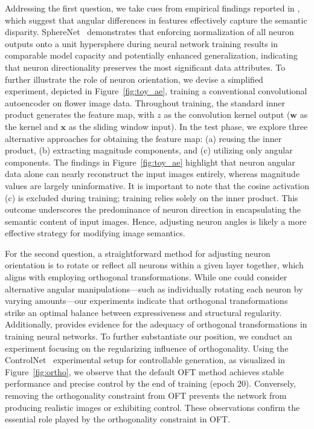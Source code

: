 Addressing the first question, we take cues from empirical findings reported in \cite{liu2018decoupled,chen2020angular}, which suggest that angular differences in features effectively capture the semantic disparity. SphereNet~\cite{liu2017deep} demonstrates that enforcing normalization of all neuron outputs onto a unit hypersphere during neural network training results in comparable model capacity and potentially enhanced generalization, indicating that neuron directionality preserves the most significant data attributes. To further illustrate the role of neuron orientation, we devise a simplified experiment, depicted in Figure~\ref{fig:toy_ae}, training a conventional convolutional autoencoder on flower image data. Throughout training, the standard inner product generates the feature map, with $z$ as the convolution kernel output ($\bm{w}$ as the kernel and $\bm{x}$ as the sliding window input). In the test phase, we explore three alternative approaches for obtaining the feature map: (a) reusing the inner product, (b) extracting magnitude components, and (c) utilizing only angular components. The findings in Figure~\ref{fig:toy_ae} highlight that neuron angular data alone can nearly reconstruct the input images entirely, whereas magnitude values are largely uninformative. It is important to note that the cosine activation (c) is excluded during training; training relies solely on the inner product. This outcome underscores the predominance of neuron direction in encapsulating the semantic content of input images. Hence, adjusting neuron angles is likely a more effective strategy for modifying image semantics.

For the second question, a straightforward method for adjusting neuron orientation is to rotate or reflect all neurons within a given layer together, which aligns with employing orthogonal transformations. While one could consider alternative angular manipulations—such as individually rotating each neuron by varying amounts—our experiments indicate that orthogonal transformations strike an optimal balance between expressiveness and structural regularity. Additionally, \cite{liu2021orthogonal} provides evidence for the adequacy of orthogonal transformations in training neural networks. To further substantiate our position, we conduct an experiment focusing on the regularizing influence of orthogonality. Using the ControlNet~\cite{zhang2023adding} experimental setup for controllable generation, as visualized in Figure~\ref{fig:ortho}, we observe that the default OFT method achieves stable performance and precise control by the end of training (epoch 20). Conversely, removing the orthogonality constraint from OFT prevents the network from producing realistic images or exhibiting control. These observations confirm the essential role played by the orthogonality constraint in OFT.

